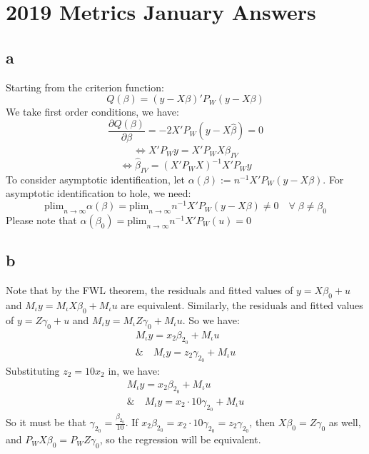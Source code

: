 \section{2019 Metrics January Answers}
\subsection{a}
Starting from the criterion function:
\[
Q(\beta) =(y-X\beta)'P_W (y-X\beta)
\]
We take first order conditions, we have:
\[
\frac{\partial Q(\beta)}{\partial \beta} = -2 X'P_W (y-X\hat{\beta})=0
\] \[
\Leftrightarrow X'P_W y = X'P_W X \hat{\beta}_{IV}
\]\[
\Leftrightarrow \hat{\beta}_{IV} = (X'P_W X)^{-1}X'P_W y
\]
To consider asymptotic identification, let \(\alpha(\beta):= n^{-1}X'P_W (y-X\beta)\).  For asymptotic identification to hole, we need:
\[
\text{plim}_{n\rightarrow\infty} \alpha(\beta) = \text{plim}_{n\rightarrow\infty}n^{-1}X'P_W (y-X\beta) \neq 0 \quad \forall \;\beta\neq \beta_0
\]
Please note that \(\alpha(\beta_0) = \text{plim}_{n\rightarrow\infty}n^{-1}X'P_W (u) = 0\)

\subsection{b}
Note that by the FWL theorem, the residuals and fitted values of \(y = X\beta_0 + u\) and \(M_\iota y =M_\iota X\beta_0 + M_\iota u\) are equivalent.  Similarly, the residuals and fitted values of \(y = Z\gamma_0 + u\) and \(M_\iota y = M_\iota Z \gamma_0 + M_\iota u\).  So we have:
\begin{align*}
    M_\iota y = x_2 \beta_{2_0} +M_\iota u \\
    \& \quad M_\iota y = z_2 \gamma_{2_0} + M_\iota u
\end{align*}
Substituting \(z_2 = 10x_2\) in, we have:
\begin{align*}
    M_\iota y = x_2 \beta_{2_0} +M_\iota u \\
    \& \quad M_\iota y = x_2\cdot 10 \gamma_{2_0} + M_\iota u
\end{align*}
So it must be that \(\gamma_{2_0} = \frac{\beta_{2_0}}{10}\).  If \(x_2 \beta_{2_0} = x_2\cdot 10 \gamma_{2_0} = z_2 \gamma_{2_0}\), then \(X\beta_0=Z\gamma_0\) as well, and \(P_WX\beta_0=P_WZ\gamma_0\), so the regression will be equivalent.
